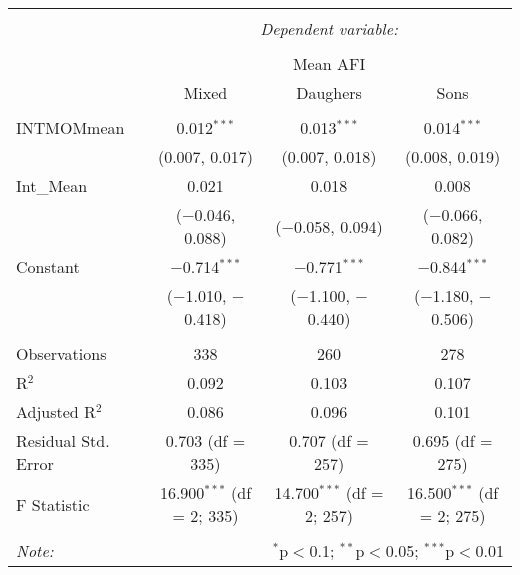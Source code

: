 
\begingroup 
\small 
\begin{tabular}{@{\extracolsep{1pt}}lccc} 
\\[-1.8ex]\hline 
\hline \\[-1.8ex] 
 & \multicolumn{3}{c}{\textit{Dependent variable:}} \\ 
\cline{2-4} 
\\[-1.8ex] & \multicolumn{3}{c}{Mean AFI} \\ 
 & Mixed & Daughers & Sons \\ 
\hline \\[-1.8ex] 
 INTMOMmean & 0.012$^{***}$ & 0.013$^{***}$ & 0.014$^{***}$ \\ 
  & (0.007, 0.017) & (0.007, 0.018) & (0.008, 0.019) \\ 
  Int\_Mean & 0.021 & 0.018 & 0.008 \\ 
  & ($-$0.046, 0.088) & ($-$0.058, 0.094) & ($-$0.066, 0.082) \\ 
  Constant & $-$0.714$^{***}$ & $-$0.771$^{***}$ & $-$0.844$^{***}$ \\ 
  & ($-$1.010, $-$0.418) & ($-$1.100, $-$0.440) & ($-$1.180, $-$0.506) \\ 
 \hline \\[-1.8ex] 
Observations & 338 & 260 & 278 \\ 
R$^{2}$ & 0.092 & 0.103 & 0.107 \\ 
Adjusted R$^{2}$ & 0.086 & 0.096 & 0.101 \\ 
Residual Std. Error & 0.703 (df = 335) & 0.707 (df = 257) & 0.695 (df = 275) \\ 
F Statistic & 16.900$^{***}$ (df = 2; 335) & 14.700$^{***}$ (df = 2; 257) & 16.500$^{***}$ (df = 2; 275) \\ 
\hline 
\hline \\[-1.8ex] 
\textit{Note:}  & \multicolumn{3}{r}{$^{*}$p$<$0.1; $^{**}$p$<$0.05; $^{***}$p$<$0.01} \\ 
\end{tabular} 
\endgroup 
